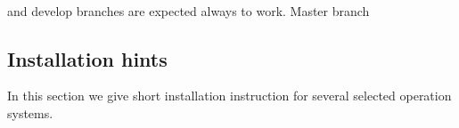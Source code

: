  \BornAgain\ 

and develop branches are expected always to work. Master branch 




\newpage
\subsection{Installation hints}

In this section we give short installation instruction for several selected operation systems.
\vspace*{3mm}








